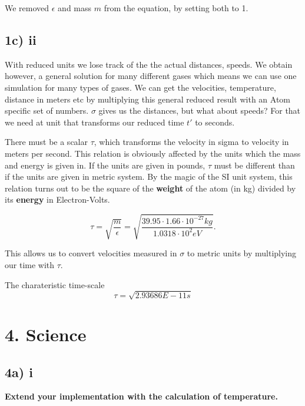 \documentclass[a4paper,10pt,english]{article}
\begin{document}
We removed $\epsilon$ and mass $m$ from the equation, by setting both to 1. 


\subsection*{1c) ii}

With reduced units we lose track of the the actual distances, speeds. We obtain however, a general solution for many different gases which means we can use one simulation for many types of gases. We can get the velocities,  temperature, distance in meters etc by multiplying this general reduced result with an Atom specific set of numbers. $\sigma$ gives us the distances, but what about speeds? For that we need at unit that transforms our reduced time $t'$ to seconds.

There must be a scalar $\tau$, which transforms the velocity in sigma to velocity in meters per second. This relation is obviously affected by the units which the mass and energy is given in. If the units are given in pounds, $\tau$ must be different than if the units are given in metric system. By the magic of the SI unit system, this relation turns out to be the square of the \textbf{weight} of the atom (in kg)  divided by its \textbf{energy} in Electron-Volts.

\begin{equation}
\tau = \sqrt{\frac{m}{\epsilon}} = \sqrt{\frac{39.95 \cdot 1.66 \cdot 10^{-27} kg}{1.0318 \cdot 10^2 eV} }.
\end{equation}

This allows us to convert velocities measured in $\sigma$ to metric units by multiplying our time with $\tau$. 


The charateristic time-scale 
\begin{equation}
\tau = \sqrt{2.93686E-11 s}
\end{equation}




\newpage

\newpage

\newpage


\section*{4. Science}
\subsection*{4a)  i }
\textbf{ Extend your implementation with the calculation of temperature.
}
\end{document}
